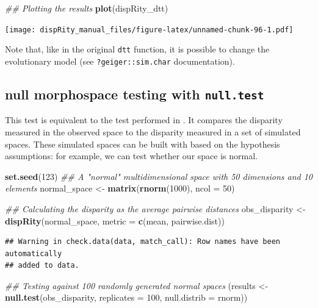 \documentclass[
]{book}
\newenvironment{Shaded}{\begin{snugshade}}{\end{snugshade}}
\newcommand{\CommentTok}[1]{\textcolor[rgb]{0.56,0.35,0.01}{\textit{#1}}}
\newcommand{\DataTypeTok}[1]{\textcolor[rgb]{0.13,0.29,0.53}{#1}}
\newcommand{\DecValTok}[1]{\textcolor[rgb]{0.00,0.00,0.81}{#1}}
\newcommand{\KeywordTok}[1]{\textcolor[rgb]{0.13,0.29,0.53}{\textbf{#1}}}
\newcommand{\NormalTok}[1]{#1}
\newcommand{\StringTok}[1]{\textcolor[rgb]{0.31,0.60,0.02}{#1}}
\begin{document}
\begin{Shaded}
\begin{Highlighting}[]
\CommentTok{\#\# Plotting the results}
\KeywordTok{plot}\NormalTok{(dispRity\_dtt)}
\end{Highlighting}
\end{Shaded}

\texttt{[image: dispRity\_manual\_files/figure-latex/unnamed-chunk-96-1.pdf]}

Note that, like in the original \texttt{dtt} function, it is possible to change the evolutionary model (see \texttt{?geiger::sim.char} documentation).

\hypertarget{null-test}{%
\subsection{\texorpdfstring{null morphospace testing with \texttt{null.test}}{null morphospace testing with null.test}}\label{null-test}}

This test is equivalent to the test performed in \citet{diaz2016global}.
It compares the disparity measured in the observed space to the disparity measured in a set of simulated spaces.
These simulated spaces can be built with based on the hypothesis assumptions: for example, we can test whether our space is normal.

\begin{Shaded}
\begin{Highlighting}[]
\KeywordTok{set.seed}\NormalTok{(}\DecValTok{123}\NormalTok{)}
\CommentTok{\#\# A "normal" multidimensional space with 50 dimensions and 10 elements}
\NormalTok{normal\_space \textless{}{-}}\StringTok{ }\KeywordTok{matrix}\NormalTok{(}\KeywordTok{rnorm}\NormalTok{(}\DecValTok{1000}\NormalTok{), }\DataTypeTok{ncol =} \DecValTok{50}\NormalTok{)}

\CommentTok{\#\# Calculating the disparity as the average pairwise distances}
\NormalTok{obs\_disparity \textless{}{-}}\StringTok{ }\KeywordTok{dispRity}\NormalTok{(normal\_space,}
                          \DataTypeTok{metric =} \KeywordTok{c}\NormalTok{(mean, pairwise.dist))}
\end{Highlighting}
\end{Shaded}

\begin{verbatim}
## Warning in check.data(data, match_call): Row names have been automatically
## added to data.
\end{verbatim}

\begin{Shaded}
\begin{Highlighting}[]
\CommentTok{\#\# Testing against 100 randomly generated normal spaces}
\NormalTok{(results \textless{}{-}}\StringTok{ }\KeywordTok{null.test}\NormalTok{(obs\_disparity, }\DataTypeTok{replicates =} \DecValTok{100}\NormalTok{,}
                      \DataTypeTok{null.distrib =}\NormalTok{ rnorm))}
\end{Highlighting}
\end{Shaded}
\end{document}

